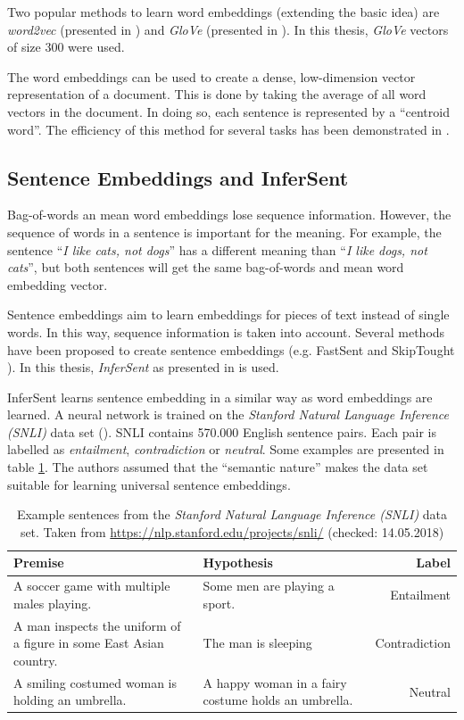 Two popular methods to learn word embeddings (extending the basic idea) are \emph{word2vec} (presented in \cite{NIPS2013_5021}) and \emph{GloVe} (presented in \cite{pennington2014glove}). In this thesis, \emph{GloVe} vectors of size 300 were used.

The word embeddings can be used to create a dense, low-dimension vector representation of a document. This is done by taking the average of all word vectors in the document. In doing so, each sentence is represented by a \enquote{centroid word}. The efficiency of this method for several tasks has been demonstrated in \cite{Wieting:2015aa}.

\subsection{Sentence Embeddings and InferSent}
Bag-of-words an mean word embeddings lose sequence information. However, the sequence of words in a sentence is important for the meaning. For example, the sentence \enquote{\emph{I like cats, not dogs}} has a different meaning than \enquote{\emph{I like dogs, not cats}}, but both sentences will get the same bag-of-words and mean word embedding vector.

Sentence embeddings aim to learn embeddings for pieces of text instead of single words. In this way, sequence information is taken into account. Several methods have been proposed to create sentence embeddings (e.g. FastSent \cite{hill2016learning} and SkipTought \cite{NIPS2015_5950}). In this thesis, \emph{InferSent} as presented in \cite{Conneau:2017aa} is used.


InferSent learns sentence embedding in a similar way as word embeddings are learned. A neural network is trained on the \emph{Stanford Natural Language Inference (SNLI)} data set (\cite{snli:emnlp2015}). SNLI contains 570.000 English sentence pairs. Each pair is labelled as \emph{entailment}, \emph{contradiction} or \emph{neutral}. Some examples are presented in table \ref{tbl:snli}. The authors assumed that the \enquote{semantic nature} %
makes the data set suitable for learning universal sentence embeddings.

\begin{table}[ht]
\caption{Example sentences from the \emph{Stanford Natural Language Inference (SNLI)} data set. Taken from \url{https://nlp.stanford.edu/projects/snli/} (checked: 14.05.2018)}
\label{tbl:snli}
\begin{tabularx}{\linewidth}{XXr}
\toprule
Premise & Hypothesis & Label \\ \midrule
A soccer game with multiple males playing. & Some men are playing a sport. & Entailment \\
A man inspects the uniform of a figure in some East Asian country. & The man is sleeping & Contradiction \\
A smiling costumed woman is holding an umbrella. & A happy woman in a fairy costume holds an umbrella. & Neutral \\
\bottomrule
\end{tabularx}
\end{table}


